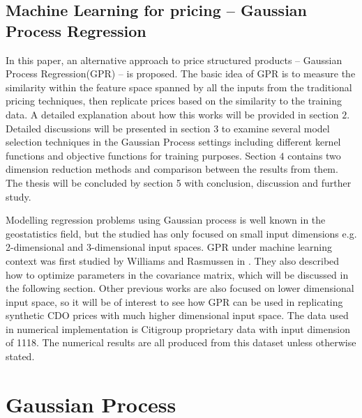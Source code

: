 \documentclass[11pt,a4paper]{article}
\theoremstyle{definition}
\numberwithin{equation}{section}
\begin{document}
	\subsection{Machine Learning for pricing -- Gaussian Process Regression}
	In this paper, an alternative approach to price structured products -- Gaussian Process Regression(GPR) -- is proposed. The basic idea of GPR is to measure the similarity within the feature space spanned by all the inputs from the traditional pricing techniques, then replicate prices based on the similarity to the training data. A detailed explanation about how this works will be provided in section $2$. Detailed discussions will be presented in section $3$ to examine several model selection techniques in the Gaussian Process settings including different kernel functions and objective functions for training purposes.  Section $4$ contains two dimension reduction methods and comparison between the results from them. The thesis will be concluded by section 5 with conclusion, discussion and further study.
	
	Modelling regression problems using Gaussian process is well known in the geostatistics field\cite{matheron,JandH}, but the studied has only focused on small input dimensions e.g. 2-dimensional and 3-dimensional input spaces. GPR under machine learning context was first studied by Williams and Rasmussen in \cite{WandR_1}. They also described how to optimize parameters in the covariance matrix, which will be discussed in the following section. Other previous works are also focused on lower dimensional input space, so it will be of interest to see how GPR can be used in replicating synthetic CDO prices with much higher dimensional input space. The data used in numerical implementation is Citigroup proprietary data with input dimension of 1118. The numerical results are all produced from this dataset unless otherwise stated.
	
	\newpage
	\section{Gaussian Process}
	
\end{document}
